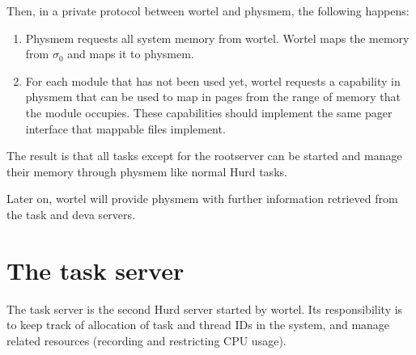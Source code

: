 Then, in a private protocol between wortel and physmem, the following
happens:

\begin{enumerate}
\item Physmem requests all system memory from wortel.  Wortel maps the
  memory from $\sigma_0$ and maps it to physmem.

  \begin{comment}
    The memory is mapped, not granted, to allow wortel (of which we
    think as a manager OS here) to unmap and recover the memory in
    case of a (possibly forced) system shutdown.
  \end{comment}

\item For each module that has not been used yet, wortel requests a
  capability in physmem that can be used to map in pages from the
  range of memory that the module occupies.  These capabilities should
  implement the same pager interface that mappable files implement.
  
  \begin{comment}
    The idea is that these capabilities can be used in the
    \texttt{exec()} protocol to start up the tasks for these modules.
    If a module is not a task, the capability can be used to access
    the module data by mapping it into the address space like a file.
    Physmem can even swap out pages that back these objects on memory
    pressure.

    So, the physical memory server is in fact a simple filesystem for
    these initial tasks, usable only for mapping operations.

    Wortel can then start up the other tasks in the module list
    using the normal \texttt{exec()} protocol.
  \end{comment}
\end{enumerate}

The result is that all tasks except for the rootserver can be started
and manage their memory through physmem like normal Hurd tasks.

Later on, wortel will provide physmem with further information
retrieved from the task and deva servers.


\section{The task server}

The task server is the second Hurd server started by wortel.  Its
responsibility is to keep track of allocation of task and thread IDs
in the system, and manage related resources (recording and restricting
CPU usage).

